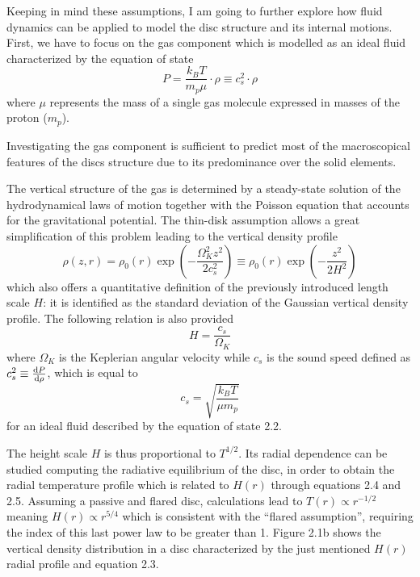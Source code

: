 \documentclass[a4paper,10pt]{report}
\begin{document}
Keeping in mind these assumptions, I am going to further explore how fluid dynamics can be applied to model the disc 
structure and its internal motions. First, we have to focus on the gas component which is modelled as an ideal fluid characterized
by the equation of state
\begin{equation}
    P = \frac{k_BT}{m_p\mu}\cdot \rho \equiv c_s^2 \cdot \rho
\end{equation}
where $\mu$ represents the mass of a single gas molecule expressed in masses of the proton ($m_p$).

Investigating the gas component is sufficient to predict most of the macroscopical features of the discs structure due to its
predominance over the solid elements. 

The vertical structure of the gas is determined by a steady-state solution of the hydrodynamical laws of motion together with the Poisson equation that
accounts for the gravitational potential. The thin-disk assumption allows a great simplification
 of this problem leading to the vertical density profile \cite[pp. 38-41]{book_planet_form}
\begin{equation}
    \rho(z, r) = \rho_0(r)\exp(-\frac{\Omega_K^2z^2}{2c_s^2}) \equiv \rho_0(r)\exp(-\frac{z^2}{2H^2})
\end{equation}
which also offers a quantitative definition of the previously introduced length scale
$H$: it is identified as the 
standard deviation of the Gaussian vertical density profile.
The following relation is also provided
\begin{equation}
    H = \frac{c_s}{\Omega_K}
\end{equation}
where $\Omega_K$ is the Keplerian 
angular velocity while $c_s$ is the sound speed defined as $c_s^2 \equiv \dv{P}{\rho}$, which is equal to 
\begin{equation}
    c_s = \sqrt{\frac{k_BT}{\mu m_p}}
\end{equation}
for an 
ideal fluid described by the equation of state 2.2.

The height scale $H$ is thus proportional to $T^{1/2}$. Its radial dependence
can be studied computing the radiative equilibrium of the disc, in order to obtain the 
radial temperature profile which is related to $H(r)$ through equations 2.4 and 2.5.
Assuming a passive and flared disc, calculations lead to $T(r) \propto r^{-1/2}$ 
meaning $H(r) \propto r^{5/4}$ which is consistent with the ``flared assumption'', requiring the index of this last
power law to be greater than 1.
Figure 2.1b shows the vertical density distribution in a disc characterized by the just mentioned $H(r)$ radial profile
and equation 2.3.
\end{document}
